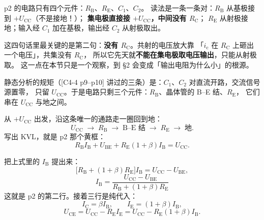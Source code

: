 \documentclass[11pt]{ctexart}
\begin{document}

p2 的电路只有四个元件：$R_{\mathrm{B}}$、$R_{\mathrm{E}}$、$C_1$、$C_2$。
读法是一条一条对：$R_{\mathrm{B}}$ 从基极接到 $+U_{\mathrm{CC}}$（不是接地！）；
\textbf{集电极直接接 $+U_{\mathrm{CC}}$，中间没有 $R_{\mathrm{C}}$}；
$R_{\mathrm{E}}$ 从射极接地；输入经 $C_1$ 加在基极，输出经 $C_2$ 从射极取出。

这四句话里最关键的是第二句：\textbf{没有 $R_{\mathrm{C}}$}。共射的电压放大靠
「$i_{\mathrm{c}}$ 在 $R_{\mathrm{C}}$ 上砸出一个电压」，共集没有 $R_{\mathrm{C}}$，
所以它先天就\textbf{不能在集电极取电压输出}，只能从射极取。
这一点在本节只是一个观察，到 §2 会变成「输出电阻为什么小」的根源。


静态分析的规矩（[C4-4 p9--p10] 讲过的三条）是：$C_1$、$C_2$ 对直流开路，交流信号源置零，
只留 $U_{\mathrm{CC}}$。于是电路只剩三个元件：$R_{\mathrm{B}}$、晶体管的 B--E 结、$R_{\mathrm{E}}$，
它们串在 $U_{\mathrm{CC}}$ 与地之间。

从 $+U_{\mathrm{CC}}$ 出发，沿这条唯一的通路走一圈回到地：
\[
U_{\mathrm{CC}}\;\longrightarrow\;R_{\mathrm{B}}\;\longrightarrow\;\text{B--E 结}\;\longrightarrow\;R_{\mathrm{E}}\;\longrightarrow\;\text{地}.
\]
写出 KVL，就是 p2 那个黄框：
\[
R_{\mathrm{B}}I_{\mathrm{B}}+U_{\mathrm{BE}}+R_{\mathrm{E}}(1+\beta)I_{\mathrm{B}}=U_{\mathrm{CC}} .
\]



把上式里的 $I_{\mathrm{B}}$ 提出来：
\[
\bigl[R_{\mathrm{B}}+(1+\beta)R_{\mathrm{E}}\bigr]I_{\mathrm{B}}=U_{\mathrm{CC}}-U_{\mathrm{BE}},
\]
\[
\boxed{\;I_{\mathrm{B}}=\frac{U_{\mathrm{CC}}-U_{\mathrm{BE}}}{R_{\mathrm{B}}+(1+\beta)R_{\mathrm{E}}}\;}
\]
这就是 p2 的第二行。接着三行是纯代入：
\[
I_{\mathrm{C}}=\beta I_{\mathrm{B}},\qquad I_{\mathrm{E}}=(1+\beta)I_{\mathrm{B}},
\]
\[
U_{\mathrm{CE}}=U_{\mathrm{CC}}-R_{\mathrm{E}}I_{\mathrm{E}}=U_{\mathrm{CC}}-R_{\mathrm{E}}(1+\beta)I_{\mathrm{B}} .
\]
\end{document}
